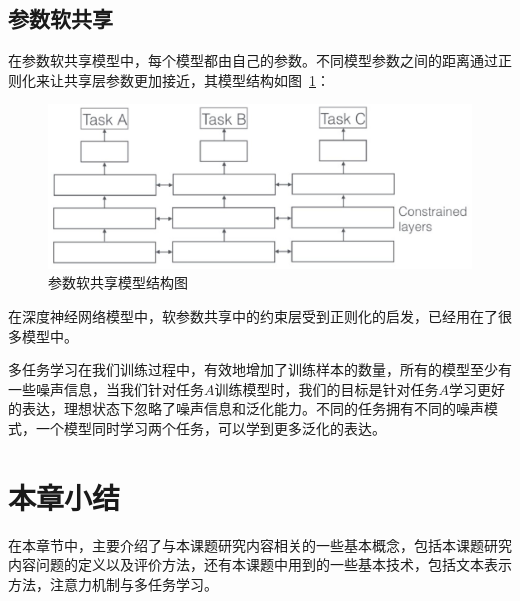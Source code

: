 \subsection{参数软共享}
在参数软共享模型中，每个模型都由自己的参数。不同模型参数之间的距离通过正则化来让共享层参数更加接近，其模型结构如图~\ref{fig:soft_share}：

\begin{figure}[htb]
    \centering
    \includegraphics[scale=0.5, clip=true]{./sources/rel_soft_share.eps}
    \vspace{-10pt}
    \caption{\label{fig:soft_share} 参数软共享模型结构图}
    \vspace{-5pt}
\end{figure}

在深度神经网络模型中，软参数共享中的约束层受到正则化的启发，已经用在了很多模型中。

多任务学习在我们训练过程中，有效地增加了训练样本的数量，所有的模型至少有一些噪声信息，当我们针对任务$A$训练模型时，我们的目标是针对任务$A$学习更好的表达，理想状态下忽略了噪声信息和泛化能力。不同的任务拥有不同的噪声模式，一个模型同时学习两个任务，可以学到更多泛化的表达。

\section{本章小结}
在本章节中，主要介绍了与本课题研究内容相关的一些基本概念，包括本课题研究内容问题的定义以及评价方法，还有本课题中用到的一些基本技术，包括文本表示方法，注意力机制与多任务学习。

